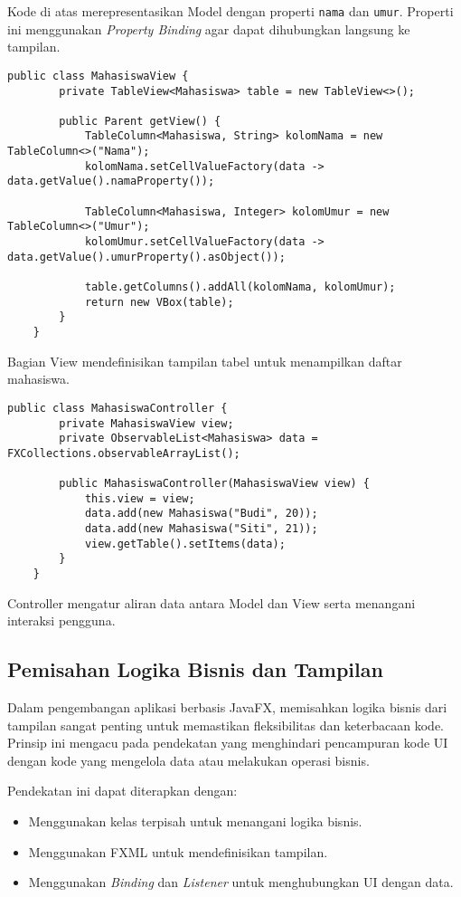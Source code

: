 Kode di atas merepresentasikan Model dengan properti \texttt{nama} dan \texttt{umur}. Properti ini menggunakan \textit{Property Binding} agar dapat dihubungkan langsung ke tampilan.

\begin{lstlisting}[style=JavaStyle, caption=View dalam aplikasi JavaFX]
	public class MahasiswaView {
		private TableView<Mahasiswa> table = new TableView<>();
		
		public Parent getView() {
			TableColumn<Mahasiswa, String> kolomNama = new TableColumn<>("Nama");
			kolomNama.setCellValueFactory(data -> data.getValue().namaProperty());
			
			TableColumn<Mahasiswa, Integer> kolomUmur = new TableColumn<>("Umur");
			kolomUmur.setCellValueFactory(data -> data.getValue().umurProperty().asObject());
			
			table.getColumns().addAll(kolomNama, kolomUmur);
			return new VBox(table);
		}
	}
\end{lstlisting}

Bagian View mendefinisikan tampilan tabel untuk menampilkan daftar mahasiswa.

\begin{lstlisting}[style=JavaStyle, caption=Controller dalam aplikasi JavaFX]
	public class MahasiswaController {
		private MahasiswaView view;
		private ObservableList<Mahasiswa> data = FXCollections.observableArrayList();
		
		public MahasiswaController(MahasiswaView view) {
			this.view = view;
			data.add(new Mahasiswa("Budi", 20));
			data.add(new Mahasiswa("Siti", 21));
			view.getTable().setItems(data);
		}
	}
\end{lstlisting}

Controller mengatur aliran data antara Model dan View serta menangani interaksi pengguna.

\subsection{Pemisahan Logika Bisnis dan Tampilan}

Dalam pengembangan aplikasi berbasis JavaFX, memisahkan logika bisnis dari tampilan sangat penting untuk memastikan fleksibilitas dan keterbacaan kode. Prinsip ini mengacu pada pendekatan yang menghindari pencampuran kode UI dengan kode yang mengelola data atau melakukan operasi bisnis.

Pendekatan ini dapat diterapkan dengan:
\begin{itemize}
	\item Menggunakan kelas terpisah untuk menangani logika bisnis.
	\item Menggunakan FXML untuk mendefinisikan tampilan.
	\item Menggunakan \textit{Binding} dan \textit{Listener} untuk menghubungkan UI dengan data.
\end{itemize}


